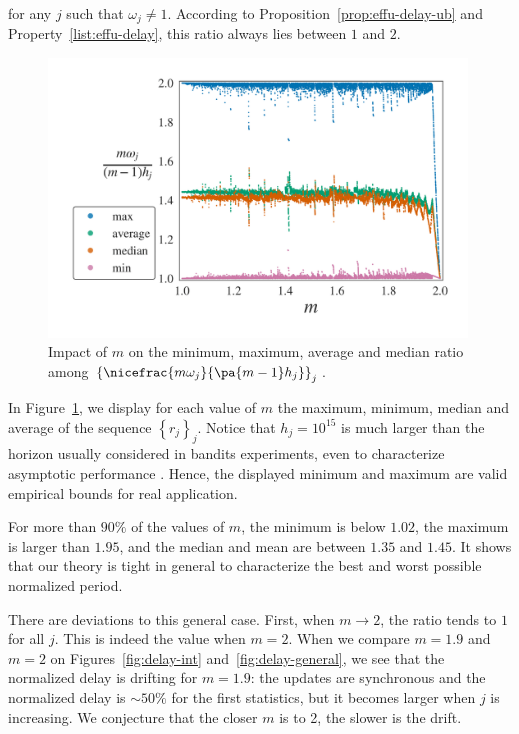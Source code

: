 for any $j$ such that $\omega_j\neq 1$. According to Proposition~\ref{prop:effu-delay-ub} and Property~\ref{list:effu-delay}, this ratio always lies between $1$ and $2$.

\begin{figure} 
\centering
\includegraphics[clip, width= 0.99\textwidth]{2.1Rested/fig/delay_ratio.pdf}
\caption{Impact of $m$ on the minimum, maximum, average and median ratio among $\left\{\nicefrac{m \omega_j}{\pa{m-1}h_j}\right\}_j$.}
\label{fig:delay-ratio}
\end{figure}

In Figure~\ref{fig:delay-ratio}, we display for each value of $m$ the maximum, minimum, median and average of the sequence $ \left\{ r_j\right\}_j$. Notice that $h_j = 10^{15}$ is much larger than the horizon usually considered in bandits experiments, even to characterize asymptotic performance \citep{chapelle2011empirical, kaufmann2012bayesian, lattimore2018refining}. Hence, the displayed minimum and maximum are valid empirical bounds for real application.

For more than $90\%$ of the values of $m$, the minimum is below $1.02$, the maximum is larger than $1.95$, and the median and mean are between $1.35$ and $1.45$. It shows that our theory is tight in general to characterize the best and worst possible normalized period. 

There are deviations to this general case. First, when $m\rightarrow 2$, the ratio tends to $1$ for all $j$. This is indeed the value when $m=2$. When we compare $m=1.9$ and $m=2$ on Figures~\ref{fig:delay-int} and~\ref{fig:delay-general}, we see that the normalized delay is drifting for $m=1.9$: the updates are synchronous and the normalized delay is $\sim 50 \%$ for the first statistics, but it becomes larger when $j$ is increasing. We conjecture that the closer $m$ is to 2, the slower is the drift.

